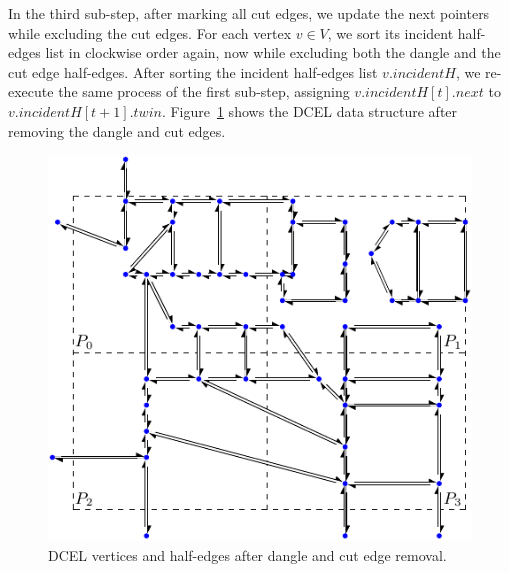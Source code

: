 In the third sub-step, after marking all cut edges, we update the next pointers while excluding the cut edges. 
For each vertex $v \in V$, we sort its incident half-edges list in clockwise order again, now while excluding both the dangle and the cut edge half-edges.
After sorting the incident half-edges list $v.incidentH$, we re-execute the same process of the first sub-step, assigning $v.incidentH[t].next$ to 
$v.incidentH[t+1].twin$. 
Figure~\ref{fig:ddcel:step2} shows the DCEL data structure after removing the dangle and cut edges.


\begin{figure}[tb]
	\centering
	\includegraphics[width=0.75 \linewidth ]{chapterSDCEL/model/ddcel-2}
	\caption{DCEL vertices and half-edges after dangle and cut edge removal.}
	\label{fig:ddcel:step2}
\end{figure}

